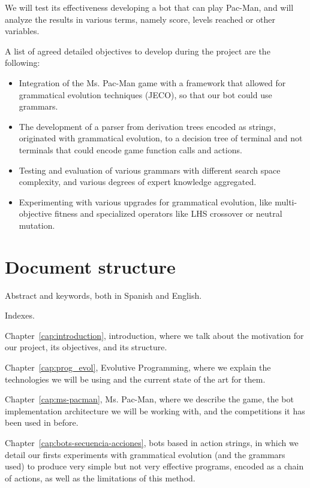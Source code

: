 We will test its effectiveness developing a bot that can play Pac-Man, and will analyze the results in various terms, namely score, levels reached or other variables.
 
A list of agreed detailed objectives to develop during the project are the following:
\begin{itemize}
\item Integration of the Ms. Pac-Man game with a framework that allowed for grammatical evolution techniques (JECO), so that our bot could use grammars.

\item The development of a parser from derivation trees encoded as strings, originated with grammatical evolution, to a decision tree of terminal and not terminals that could encode game function calls and actions.

\item Testing and evaluation of various grammars with different search space complexity, and various degrees of expert knowledge aggregated.

\item Experimenting with various upgrades for grammatical evolution, like multi-objective fitness and specialized operators like LHS crossover or neutral mutation. 
\end{itemize}

\section{Document structure}
Abstract and keywords, both in Spanish and English.

Indexes.

Chapter~\ref{cap:introduction}, introduction, where we talk about the motivation for our project, its objectives, and its structure.

Chapter~\ref{cap:prog_evol}, Evolutive Programming, where we explain the technologies we will be using and the current state of the art for them.

Chapter~\ref{cap:ms-pacman}, Ms. Pac-Man, where we describe the game, the bot implementation architecture we will be working with, and the competitions it has been used in before.

Chapter~\ref{cap:bots-secuencia-acciones}, bots based in action strings, in which we detail our firsts experiments with grammatical evolution (and the grammars used) to produce very simple but not very effective programs, encoded as a chain of actions, as well as the limitations of this method.

